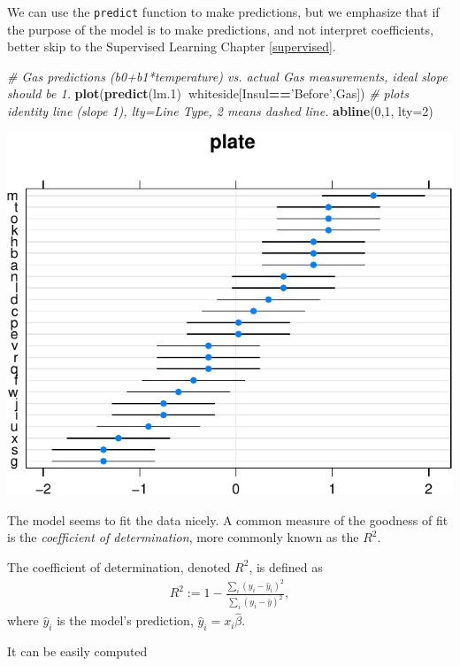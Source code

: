 \documentclass[]{book}
\newenvironment{Shaded}{\begin{snugshade}}{\end{snugshade}}
\newcommand{\CommentTok}[1]{\textcolor[rgb]{0.56,0.35,0.01}{\textit{#1}}}
\newcommand{\DataTypeTok}[1]{\textcolor[rgb]{0.13,0.29,0.53}{#1}}
\newcommand{\DecValTok}[1]{\textcolor[rgb]{0.00,0.00,0.81}{#1}}
\newcommand{\FloatTok}[1]{\textcolor[rgb]{0.00,0.00,0.81}{#1}}
\newcommand{\KeywordTok}[1]{\textcolor[rgb]{0.13,0.29,0.53}{\textbf{#1}}}
\newcommand{\NormalTok}[1]{#1}
\newcommand{\OperatorTok}[1]{\textcolor[rgb]{0.81,0.36,0.00}{\textbf{#1}}}
\newcommand{\StringTok}[1]{\textcolor[rgb]{0.31,0.60,0.02}{#1}}
\theoremstyle{definition}
\theoremstyle{definition}
\theoremstyle{definition}
\theoremstyle{remark}
\let\BeginKnitrBlock\begin \let\EndKnitrBlock\end
\begin{document}
We can use the \texttt{predict} function to make predictions, but we emphasize that if the purpose of the model is to make predictions, and not interpret coefficients, better skip to the Supervised Learning Chapter \ref{supervised}.

\begin{Shaded}
\begin{Highlighting}[]
\CommentTok{# Gas predictions (b0+b1*temperature) vs. actual Gas measurements, ideal slope should be 1.}
\KeywordTok{plot}\NormalTok{(}\KeywordTok{predict}\NormalTok{(lm}\FloatTok{.1}\NormalTok{)}\OperatorTok{~}\NormalTok{whiteside[Insul}\OperatorTok{==}\StringTok{'Before'}\NormalTok{,Gas])}
\CommentTok{# plots identity line (slope 1), lty=Line Type, 2 means dashed line.}
\KeywordTok{abline}\NormalTok{(}\DecValTok{0}\NormalTok{,}\DecValTok{1}\NormalTok{, }\DataTypeTok{lty=}\DecValTok{2}\NormalTok{)}
\end{Highlighting}
\end{Shaded}

\includegraphics[width=0.5\linewidth]{Rcourse_files/figure-latex/unnamed-chunk-157-1}

The model seems to fit the data nicely.
A common measure of the goodness of fit is the \emph{coefficient of determination}, more commonly known as the \(R^2\).



\BeginKnitrBlock{definition}[R2]
\protect\hypertarget{def:unnamed-chunk-158}{}{\label{def:unnamed-chunk-158} {} }The coefficient of determination, denoted \(R^2\), is defined as
\begin{align}
  R^2:= 1-\frac{\sum_i (y_i - \hat y_i)^2}{\sum_i (y_i - \bar y)^2},
\end{align}
where \(\hat y_i\) is the model's prediction, \(\hat y_i = x_i \hat \beta\).
\EndKnitrBlock{definition}

It can be easily computed
\end{document}
